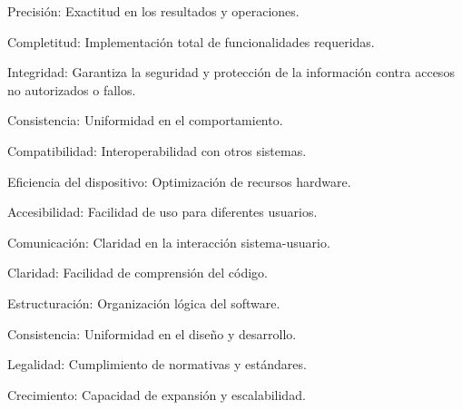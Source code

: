 		Precisión: Exactitud en los resultados y operaciones.
		
		Completitud: Implementación total de funcionalidades requeridas.
		
		Integridad: Garantiza la seguridad y protección de la información contra accesos no autorizados o fallos.
		
		Consistencia: Uniformidad en el comportamiento.
		
		Compatibilidad: Interoperabilidad con otros sistemas.
		
		Eficiencia del dispositivo: Optimización de recursos hardware.
		
		Accesibilidad: Facilidad de uso para diferentes usuarios.
		
		Comunicación: Claridad en la interacción sistema-usuario.
		
		Claridad: Facilidad de comprensión del código.
		
		Estructuración: Organización lógica del software.
		
		Consistencia: Uniformidad en el diseño y desarrollo.
		
		Legalidad: Cumplimiento de normativas y estándares.
		
		Crecimiento: Capacidad de expansión y escalabilidad.
		

	
	
	
	
				
